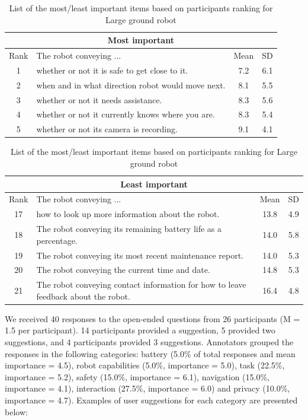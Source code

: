 \documentclass[letterpaper, 10 pt, conference]{ieeeconf}  %
\begin{document}
\begin {table}[h]
\begin{center}
\caption{List of the most/least important items based on participants ranking for Large ground robot}
\vspace{1em}
\label{table:fetch}
\begin{tabular}{|c|p{150pt}|c|c|}
 \hline
 \multicolumn{4}{|c|}{Most important} \\
 \hline
  Rank & The robot conveying ... & Mean & SD \\
 \hline
   \rowcolor{Gray}
1 & whether or not it is safe to get close to it. & 7.2 & 6.1\\
 \hline
2 & when and in what direction robot would move next. & 8.1 & 5.5\\
 \hline
3 & whether or not it needs assistance. & 8.3 & 5.6\\
 \hline
4 & whether or not it currently knows where you are. & 8.3 & 5.4\\
 \hline
5 & whether or not its camera is recording. & 9.1 & 4.1\\
 \hline
\end{tabular}

\vspace*{0.5 cm}

\begin{tabular}{|c|p{150pt}|c|c|}
 \hline
  \multicolumn{4}{|c|}{Least important} \\
 \hline
  Rank & The robot conveying ... & Mean & SD \\
 \hline
 
17 & how to look up more information about the robot. & 13.8 & 4.9\\
\hline
18 & The robot conveying its remaining battery life as a percentage. & 14.0 & 5.8\\
\hline
19 & The robot conveying its most recent maintenance report. & 14.0 & 5.3\\
\hline
20 & The robot conveying the current time and date. & 14.8 & 5.3\\
\hline
21 & The robot conveying contact information for how to leave feedback about the robot. & 16.4 & 4.8\\
\hline
\end{tabular}
\end{center}
\end{table}

We received 40 responses to the open-ended questions from 26 participants (M = 1.5 per participant). 14 participants provided a suggestion, 5 provided two suggestions, and 4 participants provided 3 suggestions. Annotators grouped the responses in the following categories: battery (5.0\% of total responses and mean importance = 4.5), robot capabilities (5.0\%, importance = 5.0), task (22.5\%, importance = 5.2), safety (15.0\%, importance = 6.1), navigation (15.0\%, importance = 4.1), interaction (27.5\%, importance = 6.0) and privacy (10.0\%, importance = 4.7). Examples of user suggestions for each category are presented below:
\end{document}
